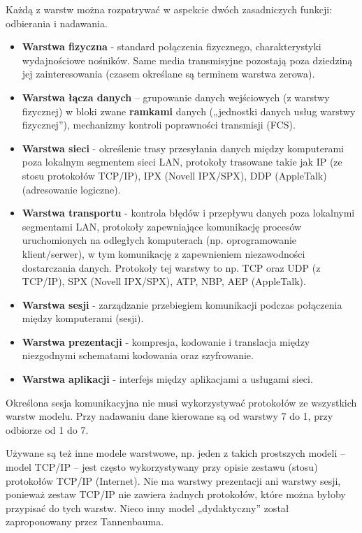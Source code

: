 \documentclass[a4paper]{article}
\begin{document}
Każdą z warstw można rozpatrywać w aspekcie dwóch zasadniczych funkcji: odbierania i
nadawania.
\begin{itemize}
\item \textbf{Warstwa fizyczna} - standard połączenia fizycznego, charakterystyki wydajnościowe nośników. Same media transmisyjne pozostają poza dziedziną jej
zainteresowania (czasem określane są terminem warstwa zerowa).
\item \textbf{Warstwa łącza danych} – grupowanie danych wejściowych (z warstwy fizycznej) w bloki zwane \textbf{ramkami} danych („jednostki
danych usług warstwy fizycznej”), mechanizmy kontroli poprawności
transmisji (FCS).
\item \textbf{Warstwa sieci} - określenie trasy przesyłania
danych między komputerami poza lokalnym segmentem sieci LAN, protokoły trasowane takie jak IP (ze stosu protokołów TCP/IP), IPX
(Novell IPX/SPX), DDP (AppleTalk) (adresowanie logiczne).
\item \textbf{Warstwa transportu} - kontrola błędów i przepływu danych
poza lokalnymi segmentami LAN, protokoły zapewniające
komunikację procesów uruchomionych na odległych komputerach (np. oprogramowanie klient/serwer), w tym komunikację z zapewnieniem
niezawodności dostarczania danych. Protokoły tej warstwy to np. TCP oraz UDP (z
TCP/IP), SPX (Novell IPX/SPX), ATP, NBP, AEP (AppleTalk).
\item \textbf{Warstwa sesji} - zarządzanie przebiegiem komunikacji podczas
połączenia między komputerami (sesji).
\item \textbf{Warstwa prezentacji} - kompresja, kodowanie i
translacja między niezgodnymi schematami kodowania oraz szyfrowanie.
\item \textbf{Warstwa aplikacji} - interfejs między aplikacjami a
usługami sieci.
\end{itemize}

Określona sesja komunikacyjna nie musi wykorzystywać protokołów ze wszystkich warstw
modelu. Przy nadawaniu dane kierowane są od warstwy 7 do 1, przy odbiorze od 1 do 7.

Używane są też inne modele warstwowe, np. jeden z takich
prostszych modeli – model TCP/IP – jest często wykorzystywany przy opisie zestawu (stosu)
protokołów TCP/IP (Internet). Nie ma warstwy prezentacji ani warstwy sesji, ponieważ zestaw TCP/IP nie zawiera
żadnych protokołów, które można byłoby przypisać do tych warstw. Nieco inny model
„dydaktyczny” został zaproponowany przez Tannenbauma.
\end{document}
